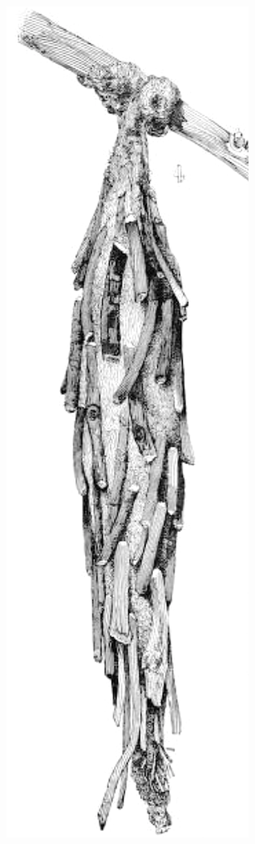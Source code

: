 \documentclass[letterpaper, 11pt]{article}
\begin{document}
\begin{figure}[ht!]
\begin{subfigure}[ht!]{0.13\textwidth}
        \includegraphics[width=\textwidth]{psychidBag.png}

\end{subfigure}
\end{figure}
\end{document}
